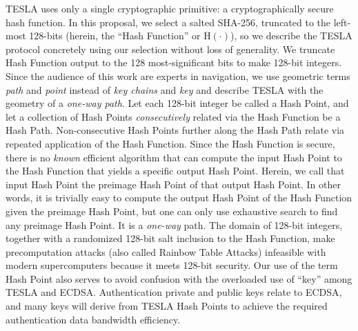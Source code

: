 \documentclass[letterpaper,times]{IONconf/IONconf}
\begin{document}
		TESLA uses only a single cryptographic primitive: a cryptographically secure hash function.
		In this proposal, we select a salted SHA-256, truncated to the left-most 128-bits (herein, the ``Hash Function'' or $\textrm{H}(\cdot)$), so we describe the TESLA protocol concretely using our selection without loss of generality.
		We truncate Hash Function output to the 128 most-significant bits to make 128-bit integers.
		Since the audience of this work are experts in navigation, we use geometric terms {\em path} and {\em point} instead of {\em key chains} and {\em key} and describe TESLA with the geometry of a {\em one-way path}.
		Let each 128-bit integer be called a Hash Point, and let a collection of Hash Points {\em consecutively} related via the Hash Function be a Hash Path.
		Non-consecutive Hash Points further along the Hash Path relate via repeated application of the Hash Function.
		Since the Hash Function is secure, there is no {\em known} efficient algorithm that can compute the input Hash Point to the Hash Function that yields a specific output Hash Point.
		Herein, we call that input Hash Point the preimage Hash Point of that output Hash Point.
		In other words, it is trivially easy to compute the output Hash Point of the Hash Function given the preimage Hash Point, but one can only use exhaustive search to find any preimage Hash Point.
		It is a {\em one-way} path.
		The domain of 128-bit integers, together with a randomized 128-bit salt inclusion to the Hash Function, make precomputation attacks (also called Rainbow Table Attacks) infeasible with modern supercomputers because it meets 128-bit security.
		Our use of the term Hash Point also serves to avoid confusion with the overloaded use of ``key'' among TESLA and ECDSA.
		Authentication private and public keys relate to ECDSA, and many keys will derive from TESLA Hash Points to achieve the required authentication data bandwidth efficiency.
\end{document}
